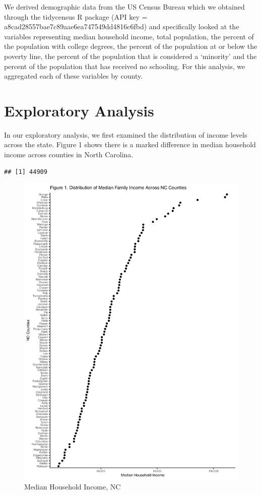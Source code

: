 \documentclass[
  12pt,
]{article}
\begin{document}
We derived demographic data from the US Census Bureau which we obtained
through the tidycensus R package (API key =
a8cad28557bae7c89aae6ea747549dd4816c6fbd) and specifically looked at the
variables representing median household income, total population, the
percent of the population with college degrees, the percent of the
population at or below the poverty line, the percent of the population
that is considered a `minority' and the percent of the population that
has received no schooling. For this analysis, we aggregated each of
these variables by county.

\newpage

\hypertarget{exploratory-analysis}{%
\section{Exploratory Analysis}\label{exploratory-analysis}}

In our exploratory analysis, we first examined the distribution of
income levels across the state. Figure 1 shows there is a marked
difference in median household income across counties in North Carolina.

\begin{verbatim}
## [1] 44909
\end{verbatim}

\begin{figure}
\centering
\includegraphics{Project_files/figure-latex/unnamed-chunk-1-1.pdf}
\caption{Median Household Income, NC}
\end{figure}
\end{document}
